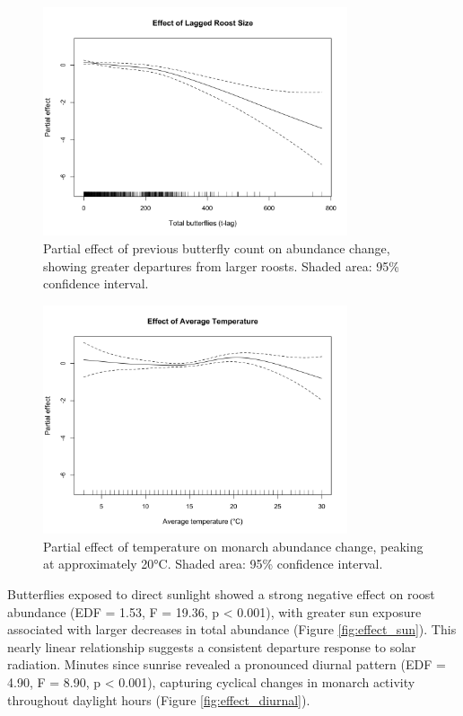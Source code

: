 \begin{figure}[htbp]
\centering
\includegraphics[width=0.8\textwidth]{supplemental/results/thesis_exports/figures/effect_lagged_roost_size.png}
\caption{Partial effect of previous butterfly count on abundance change, showing greater departures from larger roosts. Shaded area: 95\% confidence interval.}
\label{fig:effect_roost_size}
\end{figure}

\begin{figure}[htbp]
\centering
\includegraphics[width=0.8\textwidth]{supplemental/results/thesis_exports/figures/effect_temperature.png}
\caption{Partial effect of temperature on monarch abundance change, peaking at approximately 20°C. Shaded area: 95\% confidence interval.}
\label{fig:effect_temperature}
\end{figure}

Butterflies exposed to direct sunlight showed a strong negative effect on roost abundance (EDF = 1.53, F = 19.36, p < 0.001), with greater sun exposure associated with larger decreases in total abundance (Figure \ref{fig:effect_sun}). This nearly linear relationship suggests a consistent departure response to solar radiation. Minutes since sunrise revealed a pronounced diurnal pattern (EDF = 4.90, F = 8.90, p < 0.001), capturing cyclical changes in monarch activity throughout daylight hours (Figure \ref{fig:effect_diurnal}).

